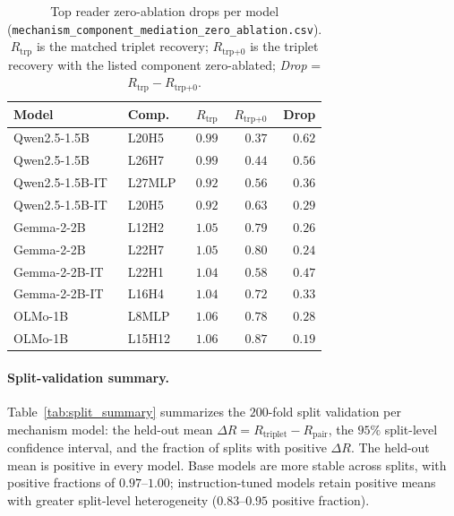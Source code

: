 \documentclass[11pt]{article}
\begin{document}
\begin{table}[H]
\centering
\footnotesize
\begin{tabular*}{\columnwidth}{@{\extracolsep{\fill}}llrrr@{}}
\toprule
Model & Comp. & $R_{\text{trp}}$ & $R_{\text{trp+0}}$ & Drop \\
\midrule
Qwen2.5-1.5B    & L20H5  & $0.99$ & $0.37$ & $0.62$ \\
Qwen2.5-1.5B    & L26H7  & $0.99$ & $0.44$ & $0.56$ \\
Qwen2.5-1.5B-IT & L27MLP & $0.92$ & $0.56$ & $0.36$ \\
Qwen2.5-1.5B-IT & L20H5  & $0.92$ & $0.63$ & $0.29$ \\
Gemma-2-2B      & L12H2  & $1.05$ & $0.79$ & $0.26$ \\
Gemma-2-2B      & L22H7  & $1.05$ & $0.80$ & $0.24$ \\
Gemma-2-2B-IT   & L22H1  & $1.04$ & $0.58$ & $0.47$ \\
Gemma-2-2B-IT   & L16H4  & $1.04$ & $0.72$ & $0.33$ \\
OLMo-1B         & L8MLP  & $1.06$ & $0.78$ & $0.28$ \\
OLMo-1B         & L15H12 & $1.06$ & $0.87$ & $0.19$ \\
\bottomrule
\end{tabular*}
\caption{Top reader zero-ablation drops per model
(\texttt{mechanism\_component\_mediation\_\allowbreak zero\_ablation.csv}). $R_{\text{trp}}$ is
the matched triplet recovery; $R_{\text{trp+0}}$ is the triplet recovery with the listed
component zero-ablated; \emph{Drop} = $R_{\text{trp}} - R_{\text{trp+0}}$.}
\label{tab:mediation}
\end{table}

\paragraph{Split-validation summary.}
Table~\ref{tab:split_summary} summarizes the $200$-fold split validation per mechanism model:
the held-out mean $\Delta R = R_{\text{triplet}} - R_{\text{pair}}$, the $95\%$ split-level
confidence interval, and the fraction of splits with positive $\Delta R$. The held-out mean
is positive in every model. Base models are more stable across splits, with positive
fractions of $0.97$--$1.00$; instruction-tuned models retain positive means with greater
split-level heterogeneity ($0.83$--$0.95$ positive fraction).
\end{document}
